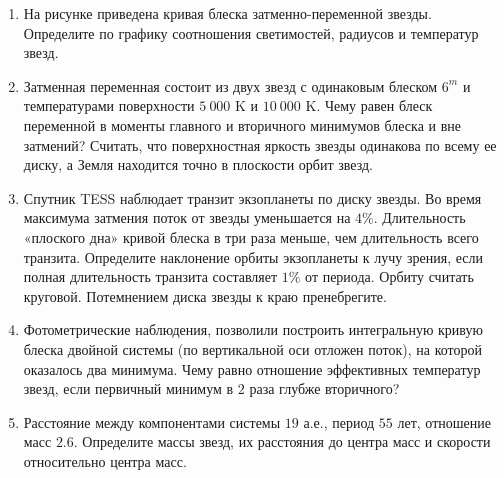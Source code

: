 \documentclass[12pt]{article}
\begin{document}
\begin{enumerate}
       \item На рисунке приведена кривая блеска  затменно-переменной звезды. Определите по графику соотношения светимостей, радиусов и температур звезд.
       \begin{figure}[h] 	
           \centering
       \end{figure}
       \item Затменная переменная состоит из двух звезд с одинаковым блеском $6^m$ и температурами поверхности $5~000$ K и $10~000$ K. Чему равен блеск переменной в моменты главного и вторичного минимумов блеска и вне затмений? Считать, что поверхностная яркость звезды одинакова по всему ее диску, а Земля находится точно в плоскости орбит звезд.
       \item Спутник TESS наблюдает транзит экзопланеты по диску звезды. Во время максимума затмения поток от звезды уменьшается на $4\%$. Длительность «плоского дна» кривой блеска в три раза меньше, чем длительность всего транзита. Определите наклонение орбиты экзопланеты к лучу зрения, если полная длительность транзита составляет $1\%$ от периода. Орбиту считать круговой. Потемнением диска звезды к краю пренебрегите.
       \item Фотометрические наблюдения, позволили построить интегральную кривую блеска двойной системы (по вертикальной оси отложен поток), на которой оказалось два минимума. Чему равно отношение эффективных температур звезд, если первичный минимум в $2$ раза  глубже вторичного?
	
       \item Расстояние между компонентами системы $19$ а.е., период $55$ лет, отношение масс $2.6$. Определите массы звезд, их расстояния до центра масс и скорости относительно центра масс.
 \end{enumerate}
\end{document}
